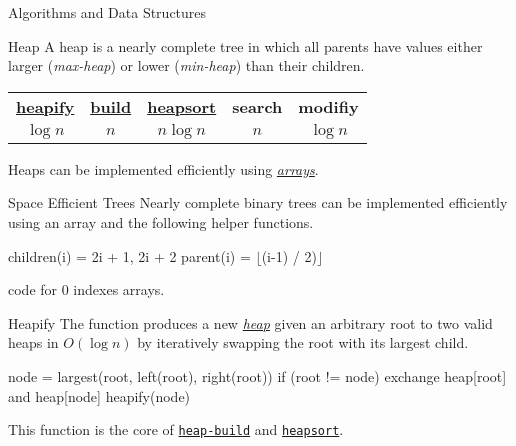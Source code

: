 \documentclass{cognito}
\begin{document}
\lstset{language=C}
\lstset{mathescape=true}


\begin{note}{Algorithms and Data Structures}
\end{note}


\begin{note}{Heap}
	A heap is a nearly complete tree in which all parents have values
	either larger (\emph{max-heap}) or lower (\emph{min-heap}) than their children.
	\begin{mdframed}[linecolor=black!25!white]%
	\begin{tabular}{@{} c | c | c | c | c  @{}}
		\hyperref[note:Heapify]{\bf heapify} &
			\hyperref[note:Building a Heap]{\bf build} & \hyperref[note:Heapsort]{\bf heapsort} & \bf search & \bf modifiy \\
		$\log n$ & $n$ & $n \log n$ & $n$ & $\log n$
	\end{tabular}%
	\end{mdframed}
	\begin{remark} Heaps can be implemented efficiently using \hyperref[note:Space Efficient Trees]{\it arrays}. \end{remark}
	\vspace{-5pt}
\end{note}

\begin{note}{Space Efficient Trees}
	Nearly complete binary trees can be implemented efficiently using an array and
	the following helper functions.
	\begin{largecode}
 children(i) = { 2i + 1, 2i + 2 }
 parent(i)   = $\lfloor$(i-1) / 2)$\rfloor$
	\end{largecode}
	\begin{remark} code for 0 indexes arrays. \end{remark}
	\vspace{-5pt}
\end{note}


\begin{note}{Heapify}
	The  function produces a new \hyperref[note:Heap]{\emph{heap}} given an arbitrary root to two
	valid heaps in $O(\log n)$ by iteratively swapping the root with its largest child.
	\begin{largecode}
 node = largest(root, left(root), right(root))
 if (root != node) {
 	exchange heap[root] and heap[node]
 	heapify(node)
 }
	\end{largecode}	
	\begin{remark} This function is the core of \hyperref[note:Building a Heap]{\tt heap-build} and \hyperref[note:Heapsort]{\tt heapsort}. \end{remark}
	\vspace{-5pt}
\end{note}
\end{document}
